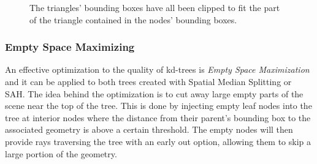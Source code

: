 \begin{figure}
  \centering

  \hspace{5mm}
  \hspace{5mm}

  \vspace{3mm}
  \parbox{10cm}{ \caption[Triangle clipping.]{The triangles' bounding boxes have
      all been clipped to fit the part of the triangle contained in the nodes'
      bounding boxes.}\label{fig:aabbClipped}}
\end{figure}


\subsubsection{Empty Space Maximizing}\label{sec:emptySpace}

An effective optimization to the quality of kd-trees is \textit{Empty Space
  Maximization} and it can be applied to both trees created with Spatial Median
Splitting or SAH. The idea behind the optimization is to cut away large empty
parts of the scene near the top of the tree. This is done by injecting empty
leaf nodes into the tree at interior nodes where the distance from their
parent's bounding box to the associated geometry is above a certain
threshold. The empty nodes will then provide rays traversing the tree with an
early out option, allowing them to skip a large portion of the geometry.

